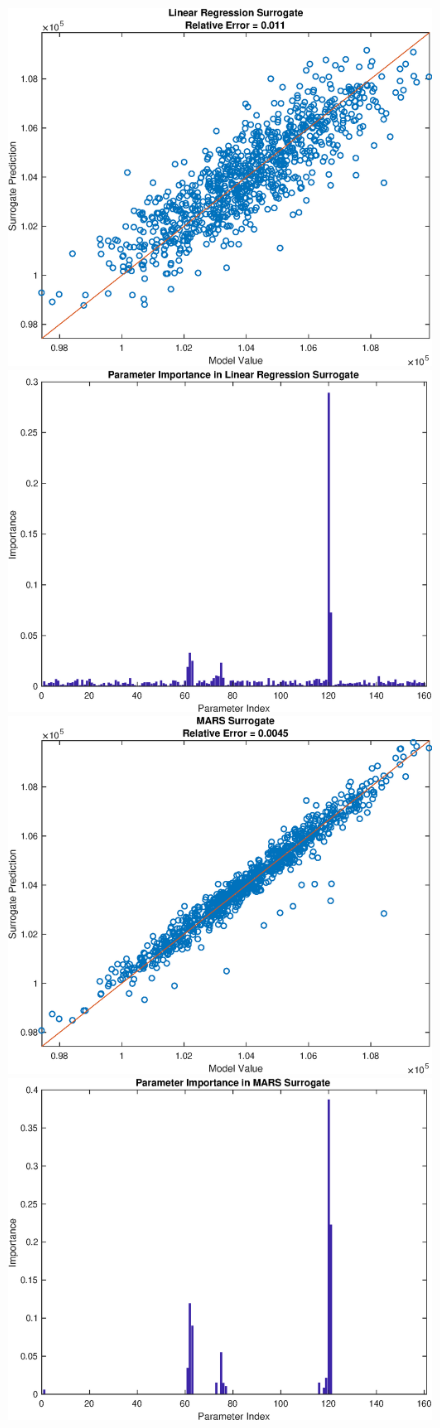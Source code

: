 \documentclass[12pt]{article}
\numberwithin{equation}{section}
\begin{document}
\begin{figure}[h]
\centering
\includegraphics[width=.49 \textwidth]{Figures/K_AC_Mean_QoI_LR_Prediction_Rectangular.eps}
\includegraphics[width=.49 \textwidth]{Figures/K_AC_Mean_QoI_LR_VI_Rectangular.eps}\\
\includegraphics[width=.49 \textwidth]{Figures/K_AC_Mean_QoI_MARS_Prediction_Rectangular.eps}
\includegraphics[width=.49 \textwidth]{Figures/K_AC_Mean_QoI_MARS_VI_Rectangular.eps}
\end{figure}
\end{document}
